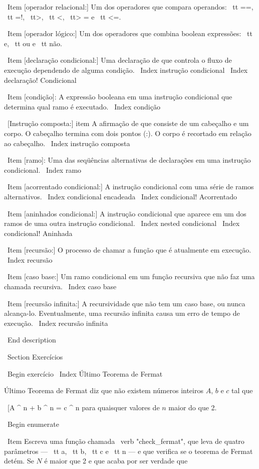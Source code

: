 \documentclass[10pt]{book}
\begin{document}
\begin {itemize}
{{{\ Item [operador relacional:] Um dos operadores que compara
operandos: {\ tt ==}, {\ tt =!}, {\ tt>}, {\ tt <}, {\ tt> =} e {\ tt <=}.

\ Item [operador lógico:] Um dos operadores que combina boolean
expressões: {\ tt e}, {\ tt ou} e {\ tt não}.

\ Item [declaração condicional:] Uma declaração de que controla o fluxo de
execução dependendo de alguma condição.
\ Index {instrução condicional}
\ Index {declaração! Condicional}

\ Item [condição]: A expressão booleana em uma instrução condicional
que determina qual ramo é executado.
\ Index {condição}

\ [Instrução composta:] item A afirmação de que consiste de um cabeçalho
e um corpo. O cabeçalho termina com dois pontos (:). O corpo é recortado
em relação ao cabeçalho.
\ Index {instrução composta}

\ Item [ramo]: Uma das seqüências alternativas de declarações em
uma instrução condicional.
\ Index {ramo}

\ Item [acorrentado condicional:] A instrução condicional com uma série
de ramos alternativos.
\ Index {condicional encadeada}
\ Index {condicional! Acorrentado}

\ Item [aninhados condicional:] A instrução condicional que aparece
em um dos ramos de uma outra instrução condicional.
\ Index {nested condicional}
\ Index {condicional! Aninhada}

\ Item [recursão:] O processo de chamar a função que é
atualmente em execução.
\ Index {recursão}

\ Item [caso base:] Um ramo condicional em um
função recursiva que não faz uma chamada recursiva.
\ Index {caso base}

\ Item [recursão infinita:] A recursividade que não tem um
caso base, ou nunca alcança-lo. Eventualmente, uma recursão infinita
causa um erro de tempo de execução.
\ Index {recursão infinita}

\ End {description}

\ Section {Exercícios}

\ Begin {} exercício
\ Index {Último Teorema de Fermat}

Último Teorema de Fermat diz que não existem números inteiros
$ A $, $ b $ e $ c $ tal que

\ [A ^ n + b ^ n = c ^ n \]
%
para quaisquer valores de $ n $ maior do que 2.

\ Begin {enumerate}

\ Item Escreva uma função chamada \ verb "check_fermat", que leva de quatro
parâmetros --- {\ tt a}, {\ tt b}, {\ tt c} e {\ tt n} --- e
que verifica se o teorema de Fermat detém. Se
$ N $ é maior que 2 e que acaba por ser verdade que 

}}}
\end{itemize}
\end{document}
